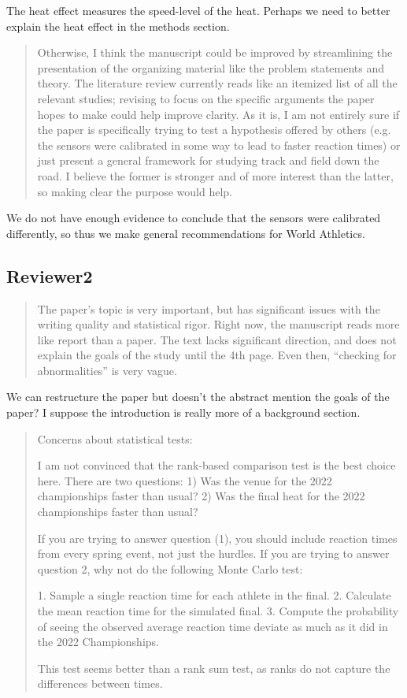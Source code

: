 \documentclass[12pt]{article}
\newenvironment{comment}%
{\begin{quotation}\noindent\small\it\color{darkblue}\ignorespaces%
}{\end{quotation}}
\begin{document}
The heat effect measures the speed-level of the heat. 
Perhaps we need to better explain the heat effect in the methods section.


\begin{comment}
Otherwise, I think the manuscript could be improved by streamlining the
presentation of the organizing material like the problem statements and theory.
The literature review currently reads like an itemized list of all the relevant
studies; revising to focus on the specific arguments the paper hopes to make
could help improve clarity. As it is, I am not entirely sure if the paper is
specifically trying to test a hypothesis offered by others (e.g. the sensors
were calibrated in some way to lead to faster reaction times) or just present a
general framework for studying track and field down the road. I believe the
former is stronger and of more interest than the latter, so making clear the
purpose would help.
\end{comment}  
We do not have enough evidence to conclude that the sensors were calibrated
differently, so thus we make general recommendations for World Athletics.



\subsection*{Reviewer2}


\begin{comment}
The paper’s topic is very important, but has significant issues with the writing
quality and statistical rigor. Right now, the manuscript reads more like report
than a paper. The text lacks significant direction, and does not explain the
goals of the study until the 4th page. Even then, “checking for abnormalities”
is very vague.

\end{comment}


We can restructure the paper but doesn't the abstract mention the goals of the
paper? I suppose the introduction is really more of a background section.


\begin{comment}
Concerns about statistical tests:

I am not convinced that the rank-based comparison test is the best choice here.
There are two questions: 1) Was the venue for the 2022 championships faster than
usual? 2) Was the final heat for the 2022 championships faster than usual?

If you are trying to answer question (1), you should include reaction times from
every spring event, not just the hurdles. If you are trying to answer question
2, why not do the following Monte Carlo test:

1. Sample a single reaction time for each athlete in the final.
2. Calculate the mean reaction time for the simulated final.
3. Compute the probability of seeing the observed average reaction time deviate
as much as it did in the 2022 Championships.

This test seems better than a rank sum test, as ranks do not capture the
differences between times.

\end{comment}
\end{document}
